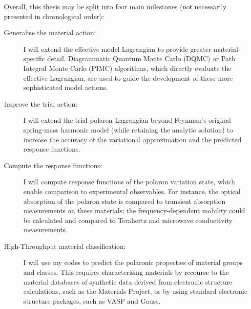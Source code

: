 
Overall, this thesis may be split into four main milestones (not necessarily presented in chronological order):

\begin{description}

\item[Generalise the material action:] I will extend the effective model Lagrangian to provide greater material-specific detail. Diagrammatic Quantum Monte Carlo (DQMC) or Path Integral Monte Carlo (PIMC) algorithms, which directly evaluate the effective Lagrangian, are used to guide the development of these more sophisticated model actions.

\item[Improve the trial action:] I will extend the trial polaron Lagrangian beyond Feynman's original spring-mass harmonic model (while retaining the analytic solution) to increase the accuracy of the variational approximation and the predicted response functions.

\item[Compute the response functions:] I will compute response functions of the polaron variation state, which enable comparison to experimental observables. For instance, the optical absorption of the polaron state is compared to transient absorption measurements on these materials; the frequency-dependent mobility could be calculated and compared to Terahertz and microwave conductivity measurements.

\item[High-Throughput material classification:] I will use my codes to predict the polaronic properties of material groups and classes. This requires characterising materials by recourse to the material databases of synthetic data derived from electronic structure calculations, such as the Materials Project, or by using standard electronic structure packages, such as VASP and Gauss.
\end{description}
